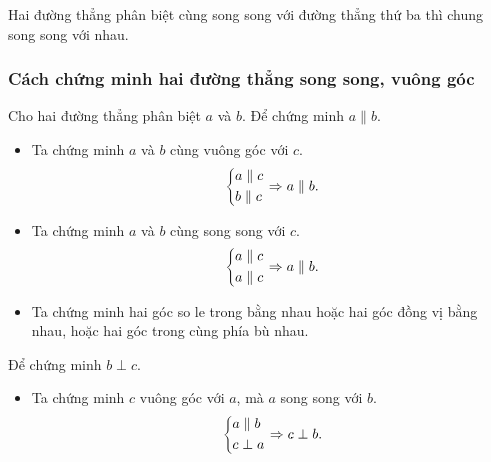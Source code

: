 \begin{tc}
	Hai đường thẳng phân biệt cùng song song với đường thẳng thứ ba thì chung song song với nhau.
	
\begin{center}
\end{center}	
	
	
\end{tc}

\subsubsection{Cách chứng minh hai đường thẳng song song, vuông góc}
Cho hai đường thẳng phân biệt $a$ và $b$. Để chứng minh $a\parallel b$.
\begin{itemize}
	\item Ta chứng minh $a$ và $b$ cùng vuông góc với $c$.
	$$\left\{\begin{aligned}&a\parallel c\\&b\parallel c\end{aligned}\right. \Rightarrow a\parallel b.$$
	\item Ta chứng minh $a$ và $b$ cùng song song với $c$.
	$$\left\{\begin{aligned}&a\parallel c\\&a\parallel c\end{aligned}\right. \Rightarrow a\parallel b.$$
	\item Ta chứng minh hai góc so le trong bằng nhau hoặc hai góc đồng vị bằng nhau, hoặc hai góc trong cùng phía bù nhau.
\end{itemize}
Để chứng minh $b\perp c$.
\begin{itemize}
	\item Ta chứng minh $c$ vuông góc với $a$, mà $a$ song song với $b$.
	$$\left\{\begin{aligned}&a\parallel b\\&c\perp a\end{aligned}\right.\Rightarrow c\perp b.$$
\end{itemize}
